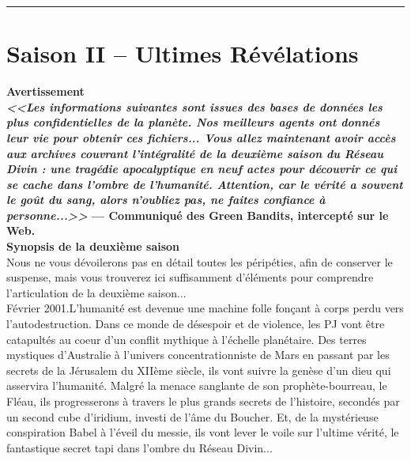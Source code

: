 \documentclass[11pt,twoside,a4paper]{book}
\begin{document}
\hrule

\clearpage

\chapter*{Saison II -- Ultimes R{\'e}v{\'e}lations}

\textbf{\Large Avertissement}~\\

\textbf{\emph{\footnotesize <<Les informations suivantes sont issues des bases de donn{\'e}es les plus confidentielles de la plan{\`e}te. Nos meilleurs agents ont donn{\'e}s leur vie pour obtenir ces fichiers... Vous allez maintenant avoir acc{\`e}s aux archives couvrant l'int{\'e}gralit{\'e} de la deuxi{\`e}me saison du R{\'e}seau Divin : une trag{\'e}die apocalyptique en neuf actes pour d{\'e}couvrir ce qui se cache dans l'ombre de l'humanit{\'e}. Attention, car le v{\'e}rit{\'e} a souvent le go{\^u}t du sang, alors n'oubliez pas, ne faites confiance {\`a} personne...>> } --- Communiqu{\'e} des Green Bandits, intercept{\'e} sur le Web. }~\\

\textbf{\Large Synopsis de la deuxi{\`e}me saison}~\\

Nous ne vous d{\'e}voilerons pas en d{\'e}tail toutes les p{\'e}rip{\'e}ties, afin de conserver le suspense, mais vous trouverez ici suffisamment d'{\'e}l{\'e}ments pour comprendre l'articulation de la deuxi{\`e}me saison... ~\\

F{\'e}vrier 2001.L'humanit{\'e} est devenue une machine folle fon\c{c}ant {\`a} corps perdu vers l'autodestruction. Dans ce monde de d{\'e}sespoir et de violence, les PJ vont {\^e}tre catapult{\'e}s au coeur d'un conflit mythique {\`a} l'{\'e}chelle plan{\'e}taire. Des terres mystiques d'Australie {\`a} l'univers concentrationniste de Mars en passant par les secrets de la J{\'e}rusalem du XII{\`e}me si{\`e}cle, ils vont suivre la gen{\`e}se d'un dieu qui asservira l'humanit{\'e}. Malgr{\'e} la menace sanglante de son proph{\`e}te-bourreau, le Fl{\'e}au, ils progresserons {\`a} travers le plus grands secrets de l'histoire, second{\'e}s par un second cube d'iridium, investi de l'{\^a}me du Boucher. Et, de la myst{\'e}rieuse conspiration Babel {\`a} l'{\'e}veil du messie, ils vont lever le voile sur l'ultime v{\'e}rit{\'e}, le fantastique secret tapi dans l'ombre du R{\'e}seau Divin... ~\\
\end{document}
